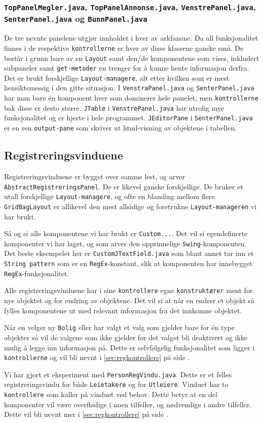 \subsubsection*{\texttt{TopPanelMegler.java}, \texttt{TopPanelAnnonse.java}, \texttt{VenstrePanel.java}, \texttt{SenterPanel.java} og \texttt{BunnPanel.java}}
De tre nevnte panelene utgjør innholdet i hver av arkfanene. 
Da all funksjonalitet finnes i de respektive \texttt{kontrollerne} er hver av disse klassene ganske små. De består i grunn bare av en \texttt{Layout} samt den/de komponentene som vises, inkludert subpaneler samt \texttt{get-metoder} en trenger for å kunne hente informasjon derfra.
Det er brukt forskjellige \texttt{Layout-managere}, alt etter hvilken som er mest hensiktsmessig i den gitte situasjon.
I \texttt{VenstraPanel.java} og \texttt{SenterPanel.java} har man bare én komponent hver som dominerer hele panelet, men \texttt{kontrollerne} bak disse er desto større.
\texttt{JTable} i \texttt{VenstrePanel.java} har utrolig mye funksjonalitet og er hjerte i hele programmet.
\texttt{JEditorPane} i \texttt{SenterPanel.java} er en ren \texttt{output-pane} som skriver ut html-visning av objektene i tabellen. 


\subsection{Registreringsvinduene}
Registreringsvinduene er bygget over samme lest, og arver \texttt{AbstractRegistreringsPanel}. De er likevel ganske forskjellige. De bruker et utall forskjellige \texttt{Layout-managere}, og ofte en blanding mellom flere. 
\texttt{GridBagLayout} er allikevel den mest allsidige og foretrukne \texttt{Layout-manageren} vi har brukt. 

Så og si alle komponentene vi har brukt er \texttt{Custom...}. Det vil si egendefinerte komponenter vi har laget, og som arver den opprinnelige \texttt{Swing}-komponenten. 
Det beste eksempelet her er \texttt{CustomJTextField.java} som blant annet tar inn et \texttt{String pattern} som er en \texttt{RegEx}-konstant, slik at komponenten har innebygget \texttt{RegEx}-funksjonalitet.

Alle registreringsvinduene har i sine \texttt{kontrollere} egne \texttt{konstruktører} ment for nye objektet og for endring av objektene. Det vil si at når en endrer et objekt så fylles komponentene ut med relevant informasjon fra det innkomne objektet.

Når en velger ny \texttt{Bolig} eller har valgt et valg som gjelder bare for én type objekter så vil de valgene som ikke gjelder for det valget bli deaktivert og ikke mulig å legge inn informasjon på. Dette er selvfølgelig funksjonalitet som ligger i \texttt{kontrollerne} og vil bli nevnt i \ref{sec:regkontrollere} på side \pageref{sec:regkontrollere}.

Vi har gjort et eksperiment med \texttt{PersonRegVindu.java}. 
Dette er et felles registreringsvindu for både \texttt{Leietakere} og for \texttt{Utleiere}. Vinduet har to \texttt{kontrollere} som kaller på vinduet ved behov.
Dette betyr at en del komponenter vil være overflødige i noen tilfeller, og nødvendige i andre tilfeller. Dette vil bli nevnt mer i \ref{sec:regkontrollere} på side \pageref{sec:regkontrollere}.

